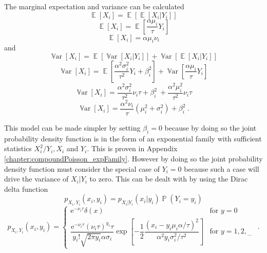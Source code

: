 \documentclass[12pt]{report}
\DeclareMathOperator{\expectation}{\mathbb{E}}
\DeclareMathOperator{\variance}{\mathbb{V}ar}
\DeclareMathOperator{\prob}{\mathbb{P}}
\newcommand{\euler}{\mathrm{e}}
\newcommand{\dotdotdot}{_{\phantom{.}\cdots}}
\begin{document}
The marginal expectation and variance \cite[pp.~149-151]{rice2009mathematical} can be calculated
\begin{equation*}
\expectation[X_i]=\expectation[\expectation[X_i|Y_i]]
\end{equation*}
\begin{equation*}
\expectation[X_i]=\expectation\left[\frac{\alpha\mu_i}{\tau}Y_i\right]
\end{equation*}
\begin{equation}
\expectation[X_i] = \alpha \mu_i \nu_i
\end{equation}
and
\begin{equation*}
\variance[X_i] = \expectation[\variance[X_i|Y_i]] + \variance[\expectation[X_i|Y_i]]
\end{equation*}
\begin{equation*}
\variance[X_i] = \expectation\left[\frac{\alpha^2\sigma_i^2}{\tau^2}Y_i+\beta_i^2\right] + \variance\left[\frac{\alpha\mu_i}{\tau}Y_i\right]
\end{equation*}
\begin{equation*}
\variance[X_i] =
\frac{\alpha^2\sigma_i^2}{\tau^2}\nu_i\tau+\beta_i^2\
+\frac{\alpha^2\mu_i^2}{\tau^2}\nu_i\tau
\end{equation*}
\begin{equation}
\variance[X_i] = \frac{\alpha^2\nu_i}{\tau}\left(\mu_i^2+\sigma_i^2\right)+\beta_i^2 \ .
\end{equation}

This model can be made simpler by setting $\beta_i=0$ because by doing so the joint probability density function is in the form of an exponential family with sufficient statistics $X_i^2/Y_i,X_i$ and $Y_i$. This is proven in Appendix \ref{chapter:compoundPoisson_expFamily}. However by doing so the joint probability density function must consider the special case of $Y_i=0$ because such a case will drive the variance of $X_i|Y_i$ to zero. This can be dealt with by using the Dirac delta function \cite[pp.~439-443]{riley2006mathematical}
\begin{equation*}
p_{X_i,Y_i}\left(x_i,y_i\right)=
p_{X_i|Y_i}(x_i|y_i)\prob(Y_i=y_i)
\end{equation*}
\begin{equation}
p_{X_i,Y_i}\left(x_i,y_i\right)=
\begin{cases}
\euler^{-\nu_i\tau}\delta(x) & \text{for }y=0
\\
\dfrac{\euler^{-\nu_i\tau}(\nu_i\tau)^{y_i}\tau}{y_i!\sqrt{2\pi y_i}\alpha\sigma_i}
\exp\left[-\dfrac{1}{2}\dfrac{\left(x_i-y_i\mu_i\alpha/\tau\right)^2}{\alpha^2y_i\sigma_i^2/\tau^2}\right] & \text{for }y=1,2,\dotdotdot
\end{cases} \ .
\label{eq:compoundPoisson_jointpdf}
\end{equation}
\end{document}
